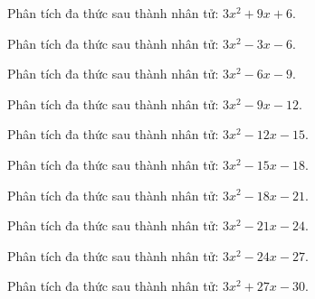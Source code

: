 \begin{bt}
	Phân tích đa thức sau thành nhân tử: $3 x^2 + 9 x + 6$.
\end{bt}
\begin{bt}
	Phân tích đa thức sau thành nhân tử: $3 x^2 - 3 x - 6$.
\end{bt}
\begin{bt}
	Phân tích đa thức sau thành nhân tử: $3 x^2 - 6 x - 9$.
\end{bt}
\begin{bt}
	Phân tích đa thức sau thành nhân tử: $3 x^2 - 9 x - 12$.
\end{bt}
\begin{bt}
	Phân tích đa thức sau thành nhân tử: $3 x^2 - 12 x - 15$.
\end{bt}
\begin{bt}
	Phân tích đa thức sau thành nhân tử: $3 x^2 - 15 x - 18$.
\end{bt}
\begin{bt}
	Phân tích đa thức sau thành nhân tử: $3 x^2 - 18 x - 21$.
\end{bt}
\begin{bt}
	Phân tích đa thức sau thành nhân tử: $3 x^2 - 21 x - 24$.
\end{bt}
\begin{bt}
	Phân tích đa thức sau thành nhân tử: $3 x^2 - 24 x - 27$.
\end{bt}
\begin{bt}
	Phân tích đa thức sau thành nhân tử: $3 x^2 + 27 x - 30$.
\end{bt}
